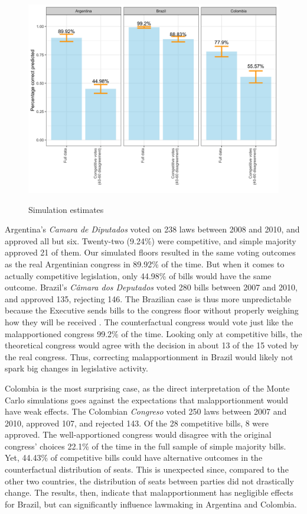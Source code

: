 \documentclass[a4paper,12pt]{article}
\begin{document}
\begin{figure}[h]
\begin{center}
\caption{Simulation estimates}
\vspace{.3cm}
\includegraphics[width=17cm]{simvots.png}
\label{fig:monte}
\end{center}
\end{figure}

Argentina's \textit{Camara de Diputados} voted on 238 laws between 2008 and 2010, and approved all but six. Twenty-two (9.24\%) were competitive, and simple majority approved 21 of them. Our simulated floors resulted in the same voting outcomes as the real Argentinian congress in 89.92\% of the time. But when it comes to actually competitive legislation, only 44.98\% of bills would have the same outcome. Brazil's \textit{Câmara dos Deputados} voted 280 bills between 2007 and 2010, and approved 135, rejecting 146. The Brazilian case is thus more unpredictable because the Executive sends bills to the congress floor without properly weighing how they will be received \citep{ames2002deadlock}. The counterfactual congress would vote just like the malapportioned congress 99.2\% of the time. Looking only at competitive bills, the theoretical congress would agree with the decision in about 13 of the 15 voted by the real congress. Thus, correcting malapportionment in Brazil would likely not spark big changes in legislative activity.

Colombia is the most surprising case, as the direct interpretation of the Monte Carlo simulations goes against the expectations that malapportionment would have weak effects. The Colombian \textit{Congreso} voted 250 laws between 2007 and 2010, approved 107, and rejected 143. Of the 28 competitive bills, 8 were approved. The well-apportioned congress would disagree with the original congress' choices 22.1\% of the time in the full sample of simple majority bills. Yet, 44.43\% of competitive bills could have alternative outcomes in the counterfactual distribution of seats. This is unexpected since, compared to the other two countries, the distribution of seats between parties did not drastically change. The results, then, indicate that malapportionment has negligible effects for Brazil, but can significantly influence lawmaking in Argentina and Colombia. 
\end{document}
